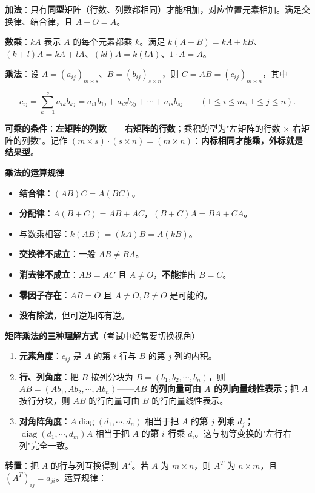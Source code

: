 \documentclass[11pt,openany,UTF8]{ctexbook}
\begin{document}
\textbf{加法}：只有\textbf{同型}矩阵（行数、列数都相同）才能相加，对应位置元素相加。满足交换律、结合律，且 $A+O=A$。

\textbf{数乘}：$kA$ 表示 $A$ 的每个元素都乘 $k$。满足 $k(A+B)=kA+kB$、$(k+l)A=kA+lA$、$(kl)A=k(lA)$、$1\cdot A=A$。

\textbf{乘法}：设 $A=(a_{ij})_{m\times s}$、$B=(b_{ij})_{s\times n}$，则 $C=AB=(c_{ij})_{m\times n}$，其中

\[c_{ij}=\sum_{k=1}^{s}a_{ik}b_{kj}=a_{i1}b_{1j}+a_{i2}b_{2j}+\cdots+a_{is}b_{sj}\qquad(1\le i\le m,\ 1\le j\le n).\]

\textbf{可乘的条件}：\textbf{左矩阵的列数 $=$ 右矩阵的行数}；乘积的型为"左矩阵的行数 $\times$ 右矩阵的列数"。记作 $(m\times s)\cdot(s\times n)=(m\times n)$：\textbf{内标相同才能乘，外标就是结果型}。

\textbf{乘法的运算规律}

\begin{itemize}
\item \textbf{结合律}：$(AB)C=A(BC)$。
\item \textbf{分配律}：$A(B+C)=AB+AC$，$(B+C)A=BA+CA$。
\item 与数乘相容：$k(AB)=(kA)B=A(kB)$。
\item \textbf{交换律不成立}：一般 $AB\ne BA$。
\item \textbf{消去律不成立}：$AB=AC$ 且 $A\ne O$，\textbf{不能}推出 $B=C$。
\item \textbf{零因子存在}：$AB=O$ 且 $A\ne O,B\ne O$ 是可能的。
\item \textbf{没有除法}，但可逆矩阵有逆。
\end{itemize}
\textbf{矩阵乘法的三种理解方式}（考试中经常要切换视角）

\begin{enumerate}
\item \textbf{元素角度}：$c_{ij}$ 是 $A$ 的第 $i$ 行与 $B$ 的第 $j$ 列的内积。
\item \textbf{行、列角度}：把 $B$ 按列分块为 $B=(b_1,b_2,\cdots,b_n)$，则 $AB=(Ab_1,Ab_2,\cdots,Ab_n)$——\textbf{$AB$ 的列向量可由 $A$ 的列向量线性表示}；把 $A$ 按行分块，则 $AB$ 的行向量可由 $B$ 的行向量线性表示。
\item \textbf{对角阵角度}：$A\operatorname{diag}(d_1,\cdots,d_n)$ 相当于把 $A$ 的\textbf{第 $j$ 列}乘 $d_j$；$\operatorname{diag}(d_1,\cdots,d_m)A$ 相当于把 $A$ 的\textbf{第 $i$ 行}乘 $d_i$。这与初等变换的"左行右列"完全一致。
\end{enumerate}
\textbf{转置}：把 $A$ 的行与列互换得到 $A^T$。若 $A$ 为 $m\times n$，则 $A^T$ 为 $n\times m$，且 $(A^T)_{ij}=a_{ji}$。运算规律：
\end{document}
